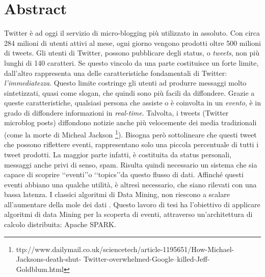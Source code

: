 
\cleardoublepage
\chapter*{Abstract}
Twitter è ad oggi il servizio di micro-blogging più utilizzato in assoluto. Con circa 284 milioni di utenti attivi al mese, ogni giorno vengono prodotti oltre 500 milioni di tweets. Gli utenti di Twitter, possono pubblicare degli status, o \emph{tweets}, non  più lunghi di 140 caratteri. Se questo vincolo da una parte costituisce un forte limite, dall'altro rappresenta una delle caratteristiche fondamentali di Twitter: \emph{l'immediatezza}. Questo limite costringe gli utenti ad produrre messaggi molto sintetizzati, quasi come slogan, che quindi sono più facili da diffondere. Grazie a queste caratteristiche, qualsiasi persona che assiste o è coinvolta in un \emph{evento}, è in grado di diffondere informazioni in \emph{real-time}.
Talvolta, i tweets (Twitter microblog posts) diffondono notizie anche più velocemente dei media tradizionali (come la morte di Micheal Jackson \footnote{ttp://www.dailymail.co.uk/sciencetech/article-1195651/How-Michael-Jacksons-death-shut-
Twitter-overwhelmed-Google–killed-Jeff-Goldblum.html}).
Bisogna però sottolineare che questi tweet che possono riflettere eventi, rappresentano solo una piccola percentuale di tutti i tweet prodotti. La maggior parte infatti, è costituita da status personali, messaggi anche privi di senso, spam. Risulta quindi necessario un sistema che sia capace di scoprire \lq\lq eventi\rq\rq o \lq\lq topics\rq\rq   da questo flusso di dati.  Affinché questi eventi abbiano una qualche utilità, è altresì necessario, che siano  rilevati con una bassa latenza. I classici algoritmi di Data Mining, non riescono a scalare all'aumentare della mole dei dati . Questo lavoro di tesi ha l'obiettivo di applicare algoritmi di data Mining per la scoperta di eventi, attraverso un'architettura di calcolo distribuita: Apache SPARK. 

